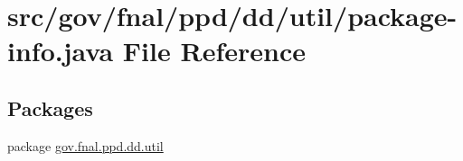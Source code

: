 \hypertarget{gov_2fnal_2ppd_2dd_2util_2package-info_8java}{\section{src/gov/fnal/ppd/dd/util/package-\/info.java File Reference}
\label{gov_2fnal_2ppd_2dd_2util_2package-info_8java}
}
\subsection*{Packages}
\begin{DoxyCompactItemize}
\item 
package \hyperlink{namespacegov_1_1fnal_1_1ppd_1_1dd_1_1util}{gov.\-fnal.\-ppd.\-dd.\-util}
\end{DoxyCompactItemize}
